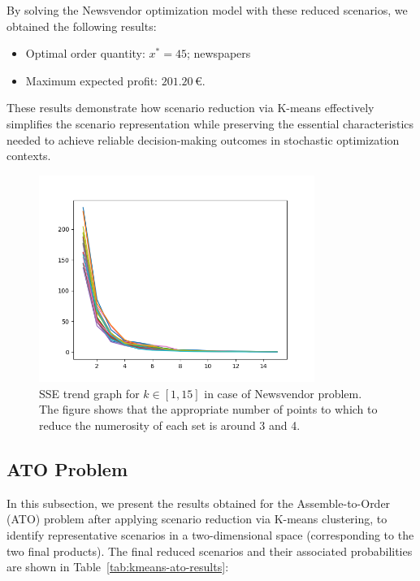 \documentclass[a4paper,12pt]{article}
\begin{document}
	By solving the Newsvendor optimization model with these reduced scenarios, we obtained the following results:
	
	\begin{itemize}
		\item Optimal order quantity: \( x^* = 45 \); newspapers
		\item Maximum expected profit: \(201.20\)\,€.
	\end{itemize}
	
	These results demonstrate how scenario reduction via K-means effectively simplifies the scenario representation while preserving the essential characteristics needed to achieve reliable decision-making outcomes in stochastic optimization contexts.
	
	\begin{figure}[H]
		\centering
		\includegraphics[width=0.8\textwidth]{../immagini/sseNV.png}
		\caption{SSE trend graph for $k \in [1,15]$ in case of Newsvendor problem. The figure shows that the appropriate number of points to which to reduce the numerosity of each set is around 3 and 4.}
		\label{fig:sse-nv}
	\end{figure}
	
	
	\newpage
	\subsection{ATO Problem}
	
	In this subsection, we present the results obtained for the Assemble-to-Order (ATO) problem after applying scenario reduction via K-means clustering, to identify representative scenarios in a two-dimensional space (corresponding to the two final products). The final reduced scenarios and their associated probabilities are shown in Table~\ref{tab:kmeans-ato-results}:
	
\end{document}
